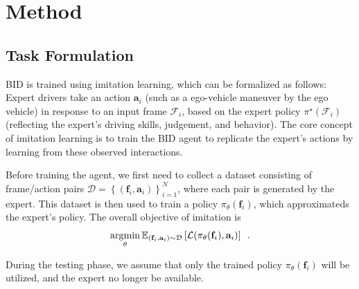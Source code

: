 \section{Method}

\subsection{Task Formulation}

\hspace{1pc}BID is trained using imitation learning, which can be formalized as follows:
Expert drivers take an action $\mathbf{a}_{i}$ (such as a ego-vehicle maneuver by the ego vehicle) in response to an input frame $\mathcal{F}_i$, based on the expert policy $\pi^{\star}(\mathcal{F}_{i})$ (reflecting the expert's driving skills, judgement, and behavior).
The core concept of imitation learning is to train the BID agent to replicate the expert's actions by learning from these observed interactions.


Before training the agent, we first need to collect a dataset consisting of frame/action pairs $\mathcal{D} = \left\{(\mathbf{f}_{i}, \mathbf{a}_{i})\right\}_{i=1}^N$, where each pair is generated by the expert.
This dataset is then used to train a policy $\pi_{\theta}(\mathbf{f}_{i})$, which approximateds the expert's policy.
The overall objective of imitation is 
\begin{equation} \label{eq:target}
	\operatorname*{\arg\!\min}_{\theta} \mathbb{E}_{(\mathbf{f}_{i}, \mathbf{a}_{i})\sim \mathcal{D}} \left[ \mathcal{L}(\pi_{\theta}(\mathbf{f}_{i}), \mathbf{a}_{i}) \right] \enspace .
\end{equation}

During the testing phase, we assume that only the trained policy $\pi_{\theta}(\mathbf{f}_{i})$ will be utilized, and the expert no longer be available.

